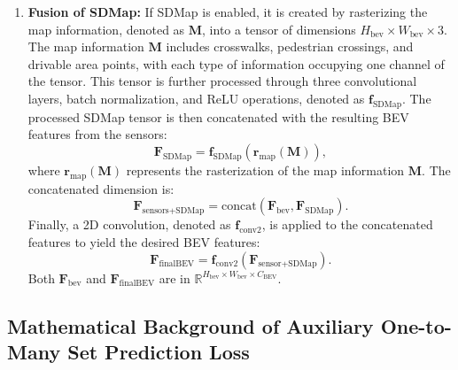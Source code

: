\begin{enumerate}
\item \textbf{Fusion of SDMap:} If SDMap is enabled, it is created by rasterizing the map information, denoted as $\mathbf{M}$, into a tensor of dimensions $H_{\text{bev}} \times W_{\text{bev}} \times 3$. The map information $\mathbf{M}$ includes crosswalks, pedestrian crossings, and drivable area points, with each type of information occupying one channel of the tensor. This tensor is further processed through three convolutional layers, batch normalization, and ReLU operations, denoted as $\mathbf{f}_{\text{SDMap}}$. The processed SDMap tensor is then concatenated with the resulting BEV features from the sensors:
    \begin{equation}
        \mathbf{F}_{\text{SDMap}} = \mathbf{f}_{\text{SDMap}}(\mathbf{r}_{\text{map}}(\mathbf{M})),
    \end{equation}
    where $\mathbf{r}_{\text{map}}(\mathbf{M})$ represents the rasterization of the map information $\mathbf{M}$.
    The concatenated dimension is:
    \begin{equation}
        \mathbf{F}_{\text{sensors+SDMap}} = \text{concat}(\mathbf{F}_{\text{bev}}, \mathbf{F}_{\text{SDMap}}).
    \end{equation}
    Finally, a 2D convolution, denoted as $\mathbf{f}_{\text{conv2}}$, is applied to the concatenated features to yield the desired BEV features:
    \begin{equation}
        \mathbf{F}_{\text{finalBEV}} = \mathbf{f}_{\text{conv2}}(\mathbf{F}_{\text{sensor+SDMap}}).
    \end{equation}
    Both $\mathbf{F}_{\text{bev}}$ and $\mathbf{F}_{\text{finalBEV}}$ are in $\mathbb{R}^{H_{\text{bev}} \times W_{\text{bev}} \times C_{\text{BEV}}}$.
\end{enumerate}

\subsection{Mathematical Background of Auxiliary One-to-Many Set Prediction Loss }
\label{sup_sec: one_to_many}

